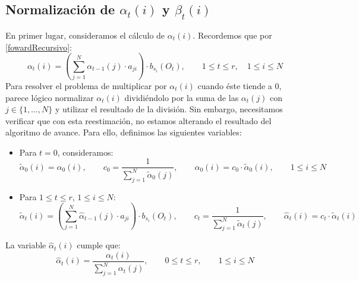 \subsection{Normalización de $\alpha_t(i)$ y $\beta_t(i)$}
En primer lugar, consideramos el cálculo de $\alpha_t(i)$. Recordemos que por \eqref{fowardRecursivo}:
\[\alpha_{t}(i)=\left(\sum_{j=1}^N\alpha_{t-1}(j)\cdot a_{ji}\right)\cdot b_{s_i}(O_{t}), \qquad 1\leq t\leq r , \quad 1\leq i\leq N\]
Para resolver el problema de multiplicar por $\alpha_t(i)$ cuando éste tiende a $0$, parece lógico normalizar $\alpha_t(i)$ dividiéndolo por la suma de las $\alpha_t(j)$ con $j\in\{1,\dots,N\}$ y utilizar el resultado de la división. Sin embargo, necesitamos verificar que con esta reestimación, no estamos alterando el resultado del algoritmo de avance. Para ello, definimos las siguientes variables:
\begin{itemize}
    \item Para $t=0$, consideramos:
        \begin{equation*}
            \tilde{\alpha}_0(i)=\alpha_0(i), \qquad c_0=\dfrac{1}{\displaystyle\sum_{j=1}^N\tilde{\alpha}_0(j)}, \qquad \hat{\alpha}_0(i)=c_0\cdot\tilde{\alpha}_0(i) ,\qquad 1\leq i\leq N
        \end{equation*}
    \item Para $1\leq t\leq r$, $1\leq i\leq N$:
        \begin{equation*}
            \tilde{\alpha}_t(i)=\left(\sum_{j=1}^N \hat{\alpha}_{t-1}(j)\cdot a_{ji}\right)\cdot b_{s_i}(O_t), \qquad
            c_t=\dfrac{1}{\displaystyle\sum_{j=1}^N\tilde{\alpha}_t(j)}, \qquad
            \hat{\alpha}_t(i)=c_t\cdot\tilde{\alpha}_t(i)
        \end{equation*}
\end{itemize}
\begin{proposition} \label{fórmulaAlphaMejorada}
La variable $\hat{\alpha}_t(i)$ cumple que:
\[\hat{\alpha}_t(i)=\frac{\alpha_t(i)}{\displaystyle\sum_{j=1}^N \alpha_t(j)}, \qquad 0\leq t\leq r, \qquad 1\leq i\leq N \]
\end{proposition}
